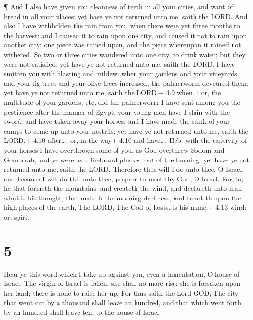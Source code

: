  ¶ And I also have given you cleanness of teeth in all your
cities, and want of bread in all your places: yet have ye not returned
unto me, saith the LORD.  And also I have withholden the
rain from you, when there were yet three months to the harvest: and I
caused it to rain upon one city, and caused it not to rain upon another
city: one piece was rained upon, and the piece whereupon it rained not
withered.  So two or three cities wandered unto one city, to
drink water; but they were not satisfied: yet have ye not returned unto
me, saith the LORD.  I have smitten you with blasting and
mildew: when your gardens and your vineyards and your fig trees and your
olive trees increased, the palmerworm devoured them: yet have ye not
returned unto me, saith the LORD.+ 4.9 when\ldots: or, the multitude of
your gardens, etc. did the palmerworm  I have sent among
you the pestilence after the manner of Egypt: your young men have I
slain with the sword, and have taken away your horses; and I have made
the stink of your camps to come up unto your nostrils: yet have ye not
returned unto me, saith the LORD.+ 4.10 after\ldots: or, in the way+
4.10 and have\ldots: Heb. with the captivity of your horses
 I have overthrown some of you, as God overthrew Sodom and
Gomorrah, and ye were as a firebrand plucked out of the burning: yet
have ye not returned unto me, saith the LORD.  Therefore
thus will I do unto thee, O Israel: and because I will do this unto
thee, prepare to meet thy God, O Israel.  For, lo, he that
formeth the mountains, and createth the wind, and declareth unto man
what is his thought, that maketh the morning darkness, and treadeth upon
the high places of the earth, The LORD, The God of hosts, is his name.+
4.13 wind: or, spirit

\hypertarget{section-4}{%
\section{5}\label{section-4}}

 Hear ye this word which I take up against you, even a
lamentation, O house of Israel.  The virgin of Israel is
fallen; she shall no more rise: she is forsaken upon her land; there is
none to raise her up.  For thus saith the Lord GOD; The city
that went out by a thousand shall leave an hundred, and that which went
forth by an hundred shall leave ten, to the house of Israel.

